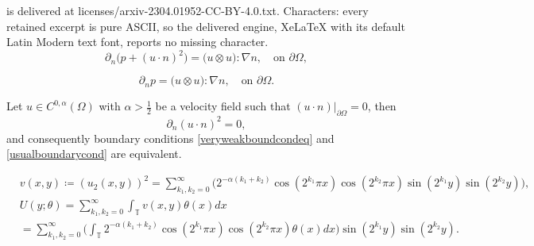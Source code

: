\documentclass[10pt,a4paper]{amsart}
\begin{document}
is delivered at licenses/arxiv-2304.01952-CC-BY-4.0.txt. Characters: every retained excerpt is pure ASCII, so the delivered engine, XeLaTeX with its default Latin Modern text font, reports no missing character.
\begin{equation} \label{veryweakboundcondeq}
\partial_n \big( p + (u \cdot n)^2 \big) = \big( u \otimes u \big) : \nabla n, \quad \text{on } \partial \Omega,
\end{equation}

\begin{equation} \label{usualboundarycond}
\partial_n p = \big( u \otimes u \big) : \nabla n, \quad \text{on } \partial \Omega.
\end{equation}

\begin{lemma} \label{equivalencelemma}
Let $u \in C^{0,\alpha} (\Omega)$ with $\alpha > \frac{1}{2}$ be a velocity field such that $(u \cdot n) \lvert_{\partial \Omega} = 0$, then
\begin{equation}
\partial_n (u \cdot n)^2 = 0,
\end{equation}
and consequently boundary conditions \eqref{veryweakboundcondeq} and \eqref{usualboundarycond} are equivalent.
\end{lemma}

\begin{equation}\label{basica1}
\begin{aligned}
&v(x,y) \coloneqq (u_2(x,y))^2= \sum_{k_1, k_2=0}^\infty \bigg( 2^{-\alpha (k_1 + k_2)} \cos(2^{k_1} \pi x)  \cos(2^{k_2}\pi  x)  \sin(2^{k_1}y)  \sin(2^{k_2} y)\bigg), \\
&U(y;\theta) =  \sum_{k_1, k_2=0}^\infty \int_{\mathbb{T}} v (x,y) \theta (x)dx \\
&= \sum_{k_1, k_2=0}^\infty \bigg( \int_{\mathbb{T}} 2^{-\alpha (k_1 + k_2)} \cos(2^{k_1}  \pi x)  \cos(2^{k_2}\pi  x)\theta (x) dx\bigg)  \sin(2^{k_1}y)  \sin(2^{k_2} y) .
\end{aligned}
\end{equation}
\end{document}
